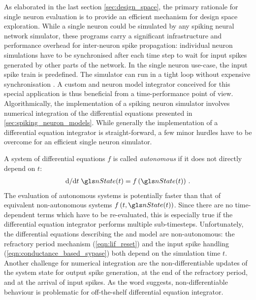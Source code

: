 As elaborated in the last section \ref{sec:design_space}, the primary rationale for single neuron evaluation is to provide an efficient mechanism for design space exploration. While a single neuron could be simulated by any spiking neural network simulator, these programs carry a significant infrastructure and performance overhead for inter-neuron spike propagation: individual neuron simulations have to be synchronised after each time step to wait for input spikes generated by other parts of the network. In the single neuron use-case, the input spike train \tIn is predefined. The simulator can run in a tight loop without expensive synchronisation \cite{morrison2007exact}. A custom \LIF and \AdEx neuron model integrator conceived for this special application is thus beneficial from a time-performance point of view. Algorithmically, the implementation of a spiking neuron simulator involves numerical integration of the differential equations presented in \cref{sec:spiking_neuron_models}.
While generally the implementation of a differential equation integrator is straight-forward, a few minor hurdles have to be overcome for an efficient single neuron \AdEx simulator.

A system of differential equations $f$ is called \emph{autonomous} if it does not directly depend on $t$:
\begin{align}
	\mathrm{d} / \mathrm{d} t \; \nState(t) = f\left(\nState(t)\right) \,.
\end{align}
The evaluation of autonomous systems is potentially faster than that of equivalent non-autonomous systems $f\left(t, \nState(t)\right)$. Since there are no time-dependent terms which have to be re-evaluated, this is especially true if the differential equation integrator performs multiple sub-timesteps. Unfortunately, the differential equations describing the \LIF and \AdEx model are non-autonomous: the refractory period mechanism (\cref{eqn:lif_reset}) and the input spike handling (\cref{eqn:conductance_based_sypase}) both depend on the simulation time $t$. Another challenge for numerical integration are the non-differentiable updates of the system state \nState for output spike generation, at the end of the refractory period, and at the arrival of input spikes. As the word suggests, non-differentiable behaviour is problematic for off-the-shelf differential equation integrator.

